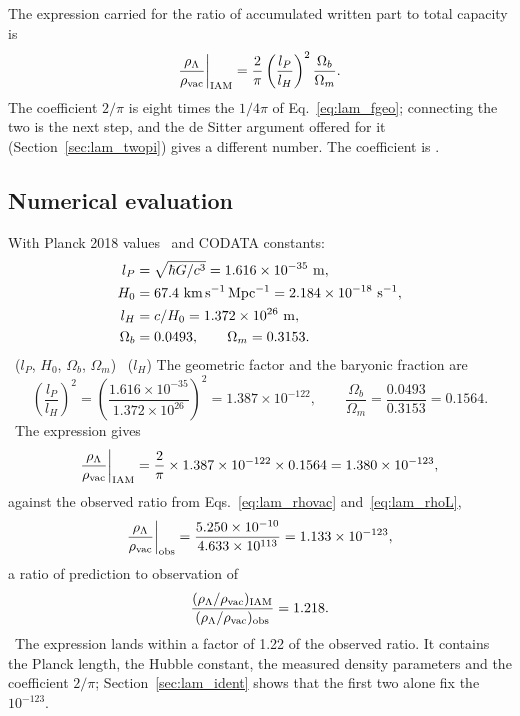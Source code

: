 The expression carried for the ratio of accumulated written part to total capacity is
\begin{equation}
\frac{\rho_\Lambda}{\rho_{\rm vac}}\bigg|_{\rm IAM}=\frac{2}{\pi}\left(\frac{l_P}{l_H}\right)^2\frac{\Omega_b}{\Omega_m}.\label{eq:base}
\end{equation}
The coefficient $2/\pi$ is eight times the $1/4\pi$ of Eq.~\eqref{eq:lam_fgeo}; connecting the two is the next step, and the de Sitter argument offered for it (Section~\ref{sec:lam_twopi}) gives a different number. The coefficient is \openprob.

\subsection{Numerical evaluation}
With Planck 2018 values~\cite{Planck2018VI} and CODATA constants:
\begin{align}
l_P&=\sqrt{\hbar G/c^3}=1.616\times10^{-35}\ {\rm m}, \label{eq:lam_in1}\\
H_0&=67.4\ {\rm km\,s^{-1}\,Mpc^{-1}}=2.184\times10^{-18}\ {\rm s^{-1}}, \label{eq:lam_in2}\\
l_H&=c/H_0=1.372\times10^{26}\ {\rm m}, \label{eq:lam_in3}\\
\Omega_b&=0.0493,\qquad \Omega_m=0.3153 . \label{eq:lam_in4}
\end{align}
\measured\ ($l_P$, $H_0$, $\Omega_b$, $\Omega_m$) \calc\ ($l_H$) The geometric factor and the baryonic fraction are
\begin{equation}
\left(\frac{l_P}{l_H}\right)^2=\left(\frac{1.616\times10^{-35}}{1.372\times10^{26}}\right)^2=1.387\times10^{-122},\qquad
\frac{\Omega_b}{\Omega_m}=\frac{0.0493}{0.3153}=0.1564 .\label{eq:lam_geo}
\end{equation}
\calc\ The expression gives
\begin{equation}
\frac{\rho_\Lambda}{\rho_{\rm vac}}\bigg|_{\rm IAM}=\frac{2}{\pi}\times1.387\times10^{-122}\times0.1564=1.380\times10^{-123},\label{eq:lam_result}
\end{equation}
against the observed ratio from Eqs.~\eqref{eq:lam_rhovac} and~\eqref{eq:lam_rhoL},
\begin{equation}
\frac{\rho_\Lambda}{\rho_{\rm vac}}\bigg|_{\rm obs}=\frac{5.250\times10^{-10}}{4.633\times10^{113}}=1.133\times10^{-123},\label{eq:lam_obs}
\end{equation}
a ratio of prediction to observation of
\begin{equation}
\frac{(\rho_\Lambda/\rho_{\rm vac})_{\rm IAM}}{(\rho_\Lambda/\rho_{\rm vac})_{\rm obs}}=1.218 .\label{eq:lam_factor}
\end{equation}
\calc\ The expression lands within a factor of 1.22 of the observed ratio. It contains the Planck length, the Hubble constant, the
measured density parameters and the coefficient $2/\pi$; Section~\ref{sec:lam_ident} shows that the first two alone fix the
$10^{-123}$.

